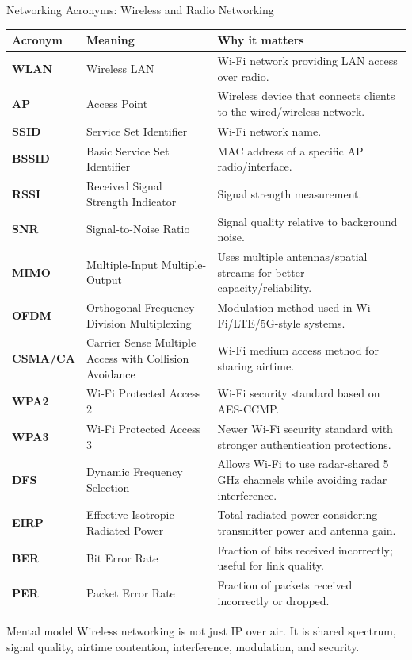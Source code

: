 \documentclass[aspectratio=169]{beamer}
\begin{document}
\begin{frame}{Networking Acronyms: Wireless and Radio Networking}
\tiny

\begin{tabular}{p{1.8cm} p{3.7cm} p{6.7cm}}
\toprule
\textbf{Acronym} & \textbf{Meaning} & \textbf{Why it matters} \\
\midrule
\textbf{WLAN} & Wireless LAN & Wi-Fi network providing LAN access over radio. \\
\textbf{AP} & Access Point & Wireless device that connects clients to the wired/wireless network. \\
\textbf{SSID} & Service Set Identifier & Wi-Fi network name. \\
\textbf{BSSID} & Basic Service Set Identifier & MAC address of a specific AP radio/interface. \\
\textbf{RSSI} & Received Signal Strength Indicator & Signal strength measurement. \\
\textbf{SNR} & Signal-to-Noise Ratio & Signal quality relative to background noise. \\
\textbf{MIMO} & Multiple-Input Multiple-Output & Uses multiple antennas/spatial streams for better capacity/reliability. \\
\textbf{OFDM} & Orthogonal Frequency-Division Multiplexing & Modulation method used in Wi-Fi/LTE/5G-style systems. \\
\textbf{CSMA/CA} & Carrier Sense Multiple Access with Collision Avoidance & Wi-Fi medium access method for sharing airtime. \\
\textbf{WPA2} & Wi-Fi Protected Access 2 & Wi-Fi security standard based on AES-CCMP. \\
\textbf{WPA3} & Wi-Fi Protected Access 3 & Newer Wi-Fi security standard with stronger authentication protections. \\
\textbf{DFS} & Dynamic Frequency Selection & Allows Wi-Fi to use radar-shared 5 GHz channels while avoiding radar interference. \\
\textbf{EIRP} & Effective Isotropic Radiated Power & Total radiated power considering transmitter power and antenna gain. \\
\textbf{BER} & Bit Error Rate & Fraction of bits received incorrectly; useful for link quality. \\
\textbf{PER} & Packet Error Rate & Fraction of packets received incorrectly or dropped. \\
\bottomrule
\end{tabular}

\vspace{0.12cm}

\begin{block}{Mental model}
Wireless networking is not just IP over air. It is shared spectrum, signal quality, airtime contention, interference, modulation, and security.
\end{block}

\end{frame}
\end{document}
